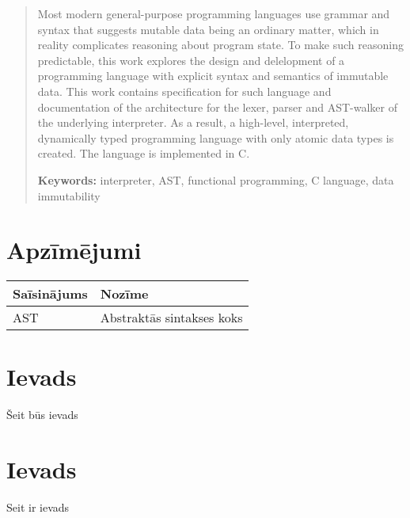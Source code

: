\documentclass[12pt,a4paper]{report}
\begin{document}
\begin{abstract}
    Most modern general-purpose programming languages use grammar and syntax that suggests mutable data being an ordinary matter, which in reality complicates reasoning about program state.
    To make such reasoning predictable, this work explores the design and delelopment of a programming language with explicit syntax and semantics of immutable data. 
    This work contains specification for such language and documentation of the architecture for the lexer, parser and AST-walker of the underlying interpreter.
    As a result, a high-level, interpreted, dynamically typed programming language with only atomic data types is created. The language is implemented in C.

    \begin{flushleft}
    \textbf{Keywords:} interpreter, AST, functional programming, C language, data immutability
    \end{flushleft}
\end{abstract} 

\tableofcontents

\newpage
\chapter*{Apzīmējumi}

\begin{flushleft}

\renewcommand{\arraystretch}{1.3}  %
\begin{tabular}{|l|l|}  %
\hline
\textbf{Saīsinājums} & \textbf{Nozīme} \\  %
\hline
AST & Abstraktās sintakses koks\\
\hline
\end{tabular}

\end{flushleft}

\newpage
\chapter*{Ievads}

Šeit būs ievads

\newpage
\chapter*{Ievads}
Seit ir ievads
\end{document}
